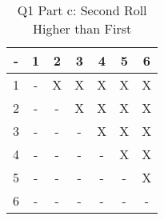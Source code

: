 \documentclass[11pt]{article}
\begin{document}
\noindent
\begin{table}
\caption{Q1 Part c: Second Roll Higher than First}
  \begin{tabular}{|c|cccccc|}
  	\hline
    - & 1 & 2 & 3 & 4 & 5 & 6 \\
    \hline
    1 & - & X & X & X & X & X\\
    2 & - & - & X & X & X & X\\
    3 & - & - & - & X & X & X\\
    4 & - & - & - & - & X & X\\
    5 & - & - & - & - & - & X\\
    6 & - & - & - & - & - & -\\
    \hline
  \end{tabular}
\end{table}
\end{document}
